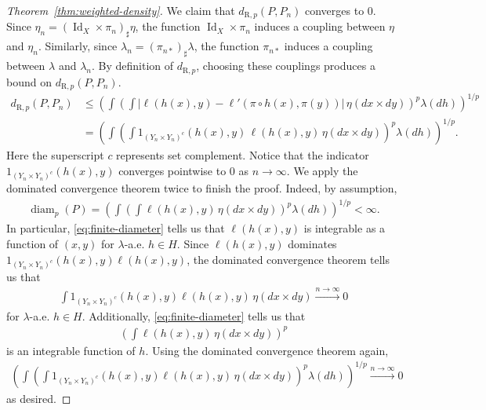 \documentclass[twoside,11pt]{article}
\DeclareMathOperator{\id}{Id}
\DeclareMathOperator{\diam}{diam}
\newcommand{\dexp}[1][]{d_{\mathrm{R}#1}}
\begin{document}
\begin{proof}[Theorem~\ref{thm:weighted-density}]
    We claim that $\dexp[,p](P,P_n)$ converges to 0. Since $\eta_n = (\id_X\times \pi_n)_\sharp \eta$, the function $\id_X\times \pi_n$ induces a coupling between $\eta$ and $\eta_n$. Similarly, since $\lambda_n = (\pi_{n*})_\sharp \lambda$, the function $\pi_{n*}$ induces a coupling between $\lambda$ and $\lambda_n$. By definition of $\dexp[,p]$, choosing these couplings produces a bound on $\dexp[,p](P,P_n)$.
    \begin{align*}
      \dexp[,p](P,P_n)
      & \leq \left(\int \left(\int \big|\ell(h(x),y) - \ell'(\pi \circ h(x),\pi(y))\big| \, \eta(dx{\times} dy) \right)^{p}\lambda(dh)\right)^{1/p}
      \\ &
      = \left(\int \left(\int 1_{(Y_n\times Y_n)^c}(h(x),y)\,\ell(h(x),y) \, \eta(dx\times dy) \right)^{p}\lambda(dh)\right)^{1/p}.
    \end{align*}
    Here the superscript $c$ represents set complement.
    Notice that the indicator $1_{(Y_n{\times} Y_n)^c}(h(x),y)$ converges pointwise to 0 as $n\to \infty$.
    We apply the dominated convergence theorem twice to finish the proof. Indeed, by assumption,
    \begin{align}
      \diam_p(P) =
      \left(
        \int \left(
          \int \ell(h(x),y) \, \eta(dx\times dy)
        \right)^p
      \lambda(dh)
      \right)^{1/p}
      < \infty. \label{eq:finite-diameter}
    \end{align}
    In particular, \eqref{eq:finite-diameter} tells us that $\ell(h(x),y)$ is integrable as a function of $(x,y)$ for $\lambda$-a.e. $h\in H$. Since $\ell(h(x),y)$ dominates $1_{(Y_n\times Y_n)^c}(h(x),y)\ell(h(x),y)$, the dominated convergence theorem tells us that
    \begin{align*}
      \int 1_{(Y_n\times Y_n)^c}(h(x),y)\ell(h(x),y)
      \, \eta(dx\times dy)
      \xrightarrow{n\to\infty} 0
    \end{align*}
    for $\lambda$-a.e. $h\in H$.
    Additionally, \eqref{eq:finite-diameter} tells us that
    \begin{align*}
        \left(
          \int \ell(h(x),y) \, \eta(dx\times dy)
        \right)^p
    \end{align*}
    is an integrable function of $h$. Using the dominated convergence theorem again,
    \begin{align*}
      \left(
        \int \left(
          \int 1_{(Y_n\times Y_n)^c}(h(x),y)\ell(h(x),y)
        \, \eta(dx\times dy) \right)^{p}
      \lambda(dh)\right)^{1/p}
      \xrightarrow{n\to\infty} 0
    \end{align*}
    as desired.
\end{proof}
\end{document}
